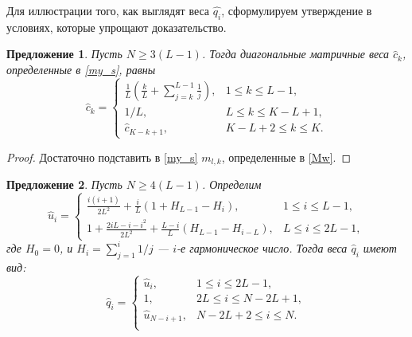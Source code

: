 \documentclass[12pt, specialist, subf,href,colorlinks=true,substylefile = spbu.rtx]{disser}
\newtheorem{proposition}{Предложение}
\theoremstyle{remark}
\theoremstyle{definition}
\begin{document}
Для иллюстрации того, как выглядят веса $\hat{q_i}$, сформулируем утверждение в условиях, которые упрощают доказательство.

\begin{proposition} \label{myweightstat}
Пусть $N \ge 3(L-1)$. Тогда диагональные матричные веса $\hat c_k$, определенные в \eqref{my_s}, равны
	\begin{equation*}
	\hat c_k = \begin{cases}
	\frac{1}{L}\left(\frac{k}{L} + \sum_{j=k}^{L-1} \frac{1}{j} \right),& 1 \le k \le L-1, \\
	1/L, & L \le k \le K - L + 1,\\
	\hat c_{K - k + 1}, & K - L + 2 \le k \le K.
	\end{cases}
	\end{equation*}
\end{proposition}

\begin{proof}
Достаточно подставить в \eqref{my_s} $m_{l,k}$, определенные в \eqref{Mw}.
\end{proof}

\begin{proposition} \label{myserweightstat}
	Пусть $N \ge 4(L-1)$. Определим
	\begin{equation*}
	\hat{u}_i = \begin{cases}
	\frac{i(i+1)}{2 L^2} + \frac{i}{L}(1 + H_{L-1} - H_i), &1 \le i \le L-1, \\
	1 + \frac{2iL-i-i^2}{2L^2} + \frac{L-i}{L}(H_{L-1} - H_{i - L}), & L \le i \le 2L-1,
	\end{cases}
	\end{equation*}
	где $H_0 = 0$, и $H_i = \sum_{j=1}^i 1/j$ --- $i$-е гармоническое число.
	Тогда веса $\hat{q}_i$ имеют вид:
	\begin{equation*}
	\hat{q}_i = \begin{cases}
	\hat{u}_i, &1 \le i \le 2L-1, \\
	1, &2L \le i \le N-2L+1,\\
	\hat{u}_{N-i+1}, &N-2L+2 \le i \le N. \\
	\end{cases}
	\end{equation*}
\end{proposition}
\end{document}
